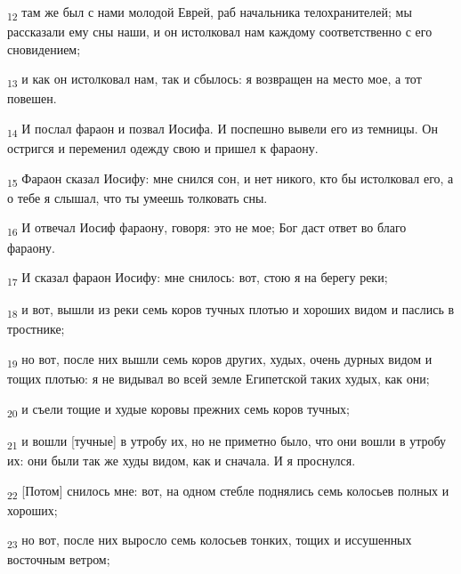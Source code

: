 \begin{tcolorbox}
\textsubscript{12} там же был с нами молодой Еврей, раб начальника телохранителей; мы рассказали ему сны наши, и он истолковал нам каждому соответственно с его сновидением;
\end{tcolorbox}
\begin{tcolorbox}
\textsubscript{13} и как он истолковал нам, так и сбылось: я возвращен на место мое, а тот повешен.
\end{tcolorbox}
\begin{tcolorbox}
\textsubscript{14} И послал фараон и позвал Иосифа. И поспешно вывели его из темницы. Он остригся и переменил одежду свою и пришел к фараону.
\end{tcolorbox}
\begin{tcolorbox}
\textsubscript{15} Фараон сказал Иосифу: мне снился сон, и нет никого, кто бы истолковал его, а о тебе я слышал, что ты умеешь толковать сны.
\end{tcolorbox}
\begin{tcolorbox}
\textsubscript{16} И отвечал Иосиф фараону, говоря: это не мое; Бог даст ответ во благо фараону.
\end{tcolorbox}
\begin{tcolorbox}
\textsubscript{17} И сказал фараон Иосифу: мне снилось: вот, стою я на берегу реки;
\end{tcolorbox}
\begin{tcolorbox}
\textsubscript{18} и вот, вышли из реки семь коров тучных плотью и хороших видом и паслись в тростнике;
\end{tcolorbox}
\begin{tcolorbox}
\textsubscript{19} но вот, после них вышли семь коров других, худых, очень дурных видом и тощих плотью: я не видывал во всей земле Египетской таких худых, как они;
\end{tcolorbox}
\begin{tcolorbox}
\textsubscript{20} и съели тощие и худые коровы прежних семь коров тучных;
\end{tcolorbox}
\begin{tcolorbox}
\textsubscript{21} и вошли [тучные] в утробу их, но не приметно было, что они вошли в утробу их: они были так же худы видом, как и сначала. И я проснулся.
\end{tcolorbox}
\begin{tcolorbox}
\textsubscript{22} [Потом] снилось мне: вот, на одном стебле поднялись семь колосьев полных и хороших;
\end{tcolorbox}
\begin{tcolorbox}
\textsubscript{23} но вот, после них выросло семь колосьев тонких, тощих и иссушенных восточным ветром;
\end{tcolorbox}

